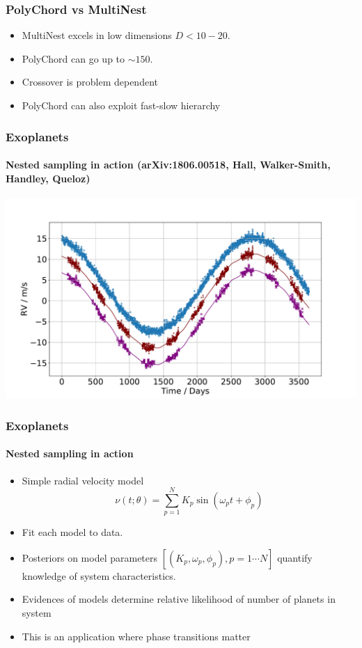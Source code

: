 \documentclass[%
]{beamer}
\begin{document}
\begin{frame}
\frametitle{PolyChord vs MultiNest}
\begin{itemize}
    \item MultiNest excels in low dimensions $D<10-20$.
    \item PolyChord can go up to $\sim 150$.
    \item Crossover is problem dependent
    \item PolyChord can also exploit fast-slow hierarchy
\end{itemize}
\end{frame}

\begin{frame}
  \frametitle{Exoplanets}
  \framesubtitle{Nested sampling in action (arXiv:1806.00518, Hall, Walker-Smith, Handley, Queloz)}
  \includegraphics[width=\textwidth]{figures/rv_full.pdf}
\end{frame}

\begin{frame}
  \frametitle{Exoplanets}
  \framesubtitle{Nested sampling in action}
  \begin{itemize}
      \item Simple radial velocity model
          \begin{equation}
              \nu(t;\theta) = \sum_{p=1}^N K_p \sin(\omega_p t + \phi_p)\nonumber
          \end{equation}
      \item Fit each model to data.
      \item Posteriors on model parameters $[(K_p,\omega_p,\phi_p),p=1\cdots N]$ quantify knowledge of system characteristics.
      \item Evidences of models determine relative likelihood of number of planets in system
      \item This is an application where phase transitions matter
  \end{itemize}
\end{frame}
\end{document}
